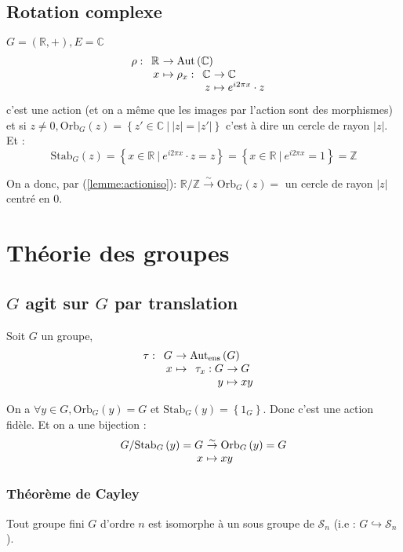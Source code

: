 \documentclass[a4paper,10pt]{report}
\newcommand{\set}[1]{\left\lbrace #1 \right\rbrace } %
\newcommand{\IZ}{\mathbb{Z}} %
\newcommand{\IR}{\mathbb{R}} %
\newcommand{\IC}{\mathbb{C}} %
\newcommand{\inj}{\hookrightarrow}
\newcommand{\bij}{\overset{\sim}{\to}} %
\newcommand{\Autens}[1]{\text{Aut}_{\text{ens}}\left(#1\right)}
\newcommand{\Aut}[1]{\text{Aut}\left(#1\right)}
\newcommand{\Orb}[2]{\text{Orb}_{#1}\left( #2 \right)}
\newcommand{\Stab}[2]{\text{Stab}_{#1}\left( #2 \right)}
\newcommand{\such}{\ \Big| \ }
\begin{document}
   \subsection{Rotation complexe}
    $G=(\IR,+), E = \IC$
    $$\rho :
    \begin{array}[t]{r@{\ }l}
      \IR & \to \Aut{\IC}\\
      x & \mapsto \rho_x : 
      \begin{array}[t]{r@{\ }l}
	\IC & \to \IC\\
	z & \mapsto e^{i2\pi x}\cdot z
      \end{array}
    \end{array}$$
    c'est une action (et on a même que les images par l'action sont des
    morphismes) et si $z\neq 0, \Orb{G}{z}=\set{z' \in \IC \such |z|=|z'|}$ c'est à
    dire un cercle de rayon $|z|$. Et :
    $$\Stab{G}{z}=\set{x \in \IR \such e^{i2 \pi x} \cdot z = z} = 
    \set{x \in \IR \such e^{i2 \pi x} = 1} = \IZ$$
    
    On a donc, par (\ref{lemme:actioniso}):  $\IR/\IZ \bij \Orb{G}{z}=$ un
    cercle de rayon $|z|$ centré en $0$. 

  \section{Théorie des groupes}
   \subsection{$G$ agit sur $G$ par translation}
    Soit $G$ un groupe,
    $$\tau : 
    \begin{array}[t]{r@{\ }l}
      G & \to \Autens{G}\\
      x & \mapsto
      \begin{array}[t]{r@{\ }l}
	\tau_x : G & \to G\\
	y & \mapsto xy
      \end{array}
    \end{array}$$

    On a $\forall y \in G, \Orb{G}{y} = G$ et $\Stab{G}{y} = \set{1_G}$. Donc
    c'est une action fidèle. Et on a une bijection :
    $$\begin{array}[t]{r@{\ }l}
      G/\Stab{G}{y}=G &\bij \Orb{G}{y} = G \\
      x &\mapsto x y
    \end{array}$$

   \subsubsection{Théorème de Cayley}
    Tout groupe fini $G$ d'ordre $n$ est isomorphe à un sous groupe de
    $\mathcal{S}_n$ (i.e : $G \inj \mathcal{S}_n$).
\end{document}
